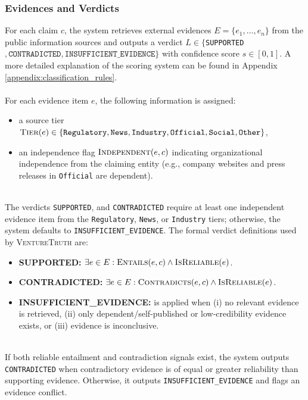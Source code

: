 \subsubsection{Evidences and Verdicts}
For each claim $c$, the system retrieves external evidences $E=\{e_1,\dots,e_n\}$ from the public information sources and outputs a verdict $L \in \{$\texttt{SUPPORTED}$,\texttt{CONTRADICTED}, \allowbreak \texttt{INSUFFICIENT\_EVIDENCE}\}$ with confidence score $s \in [0,1]$. A more detailed explanation of the scoring system can be found in Appendix \ref{appendix:classification_rules}. 
\\
\\
For each evidence item $e$, the following information is assigned:
\begin{itemize}
    \item a source tier $\textsc{Tier}(e) \in \{\texttt{Regulatory}, \texttt{News},\allowbreak \texttt{Industry}, \texttt{Official}, \allowbreak \texttt{Social}, \texttt{Other}\}$,
    \item an independence flag $\textsc{Independent}(e,c)$ indicating organizational independence from the claiming entity (e.g., company websites and press releases in \texttt{Official} are dependent).
\end{itemize}
~\\
The verdicts \texttt{SUPPORTED}, and \texttt{CONTRADICTED} require at least one independent evidence item from the \texttt{Regulatory}, \texttt{News}, or \texttt{Industry} tiers; otherwise, the system defaults to \texttt{INSUFFICIENT\_EVIDENCE}. The formal verdict definitions used by \textsc{VentureTruth} are:
\begin{itemize}
    \item \textbf{SUPPORTED:} $\exists e \in E : \textsc{Entails}(e,c) \land \textsc{IsReliable}(e)$.
    \item \textbf{CONTRADICTED:} $\exists e \in E : \textsc{Contradicts}(e,c) \land \textsc{IsReliable}(e)$.
    \item \textbf{INSUFFICIENT\_EVIDENCE:} is applied when (i) no relevant evidence is retrieved, (ii) only dependent/self-published or low-credibility evidence exists, or (iii) evidence is inconclusive.
\end{itemize}
~\\
If both reliable entailment and contradiction signals exist, the system outputs \texttt{CONTRADICTED} when contradictory evidence is of equal or greater reliability than supporting evidence. Otherwise, it outputs \texttt{INSUFFICIENT\_EVIDENCE} and flags an evidence conflict.

